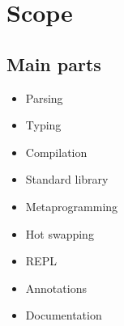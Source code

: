 \chapter{Scope}

\section{Main parts}
\begin{itemize}
\item Parsing
\item Typing
\item Compilation
\item Standard library
\item Metaprogramming
\item Hot swapping
\item REPL
\item Annotations
\item Documentation
\end{itemize}

